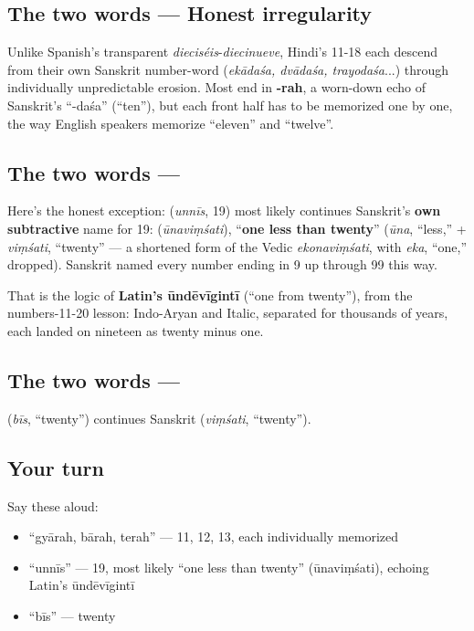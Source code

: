 \subsection*{The two words — Honest irregularity}
Unlike Spanish's transparent \emph{dieciséis}-\emph{diecinueve}, Hindi's 11-18 each descend from their own Sanskrit number-word (\emph{ekādaśa, dvādaśa, trayodaśa}...) through individually unpredictable erosion. Most end in \textbf{-rah}, a worn-down echo of Sanskrit's \textquotedblleft{}-daśa\textquotedblright{} (\textquotedblleft{}ten\textquotedblright{}), but each front half has to be memorized one by one, the way English speakers memorize \textquotedblleft{}eleven\textquotedblright{} and \textquotedblleft{}twelve\textquotedblright{}.

\subsection*{The two words — }
Here's the honest exception: \textbf{} (\emph{unnīs}, 19) most likely continues Sanskrit's \textbf{own subtractive} name for 19: \textbf{} (\emph{ūnaviṃśati}), \textquotedblleft{}\textbf{one less than twenty}\textquotedblright{} (\emph{ūna}, \textquotedblleft{}less,\textquotedblright{} + \emph{viṃśati}, \textquotedblleft{}twenty\textquotedblright{} — a shortened form of the Vedic \emph{ekonaviṃśati}, with \emph{eka}, \textquotedblleft{}one,\textquotedblright{} dropped). Sanskrit named every number ending in 9 up through 99 this way.

That is the logic of \textbf{Latin's ūndēvīgintī} (\textquotedblleft{}one from twenty\textquotedblright{}), from the numbers-11-20 lesson: Indo-Aryan and Italic, separated for thousands of years, each landed on nineteen as twenty minus one.

\subsection*{The two words — }
\textbf{} (\emph{bīs}, \textquotedblleft{}twenty\textquotedblright{}) continues Sanskrit \textbf{} (\emph{viṃśati}, \textquotedblleft{}twenty\textquotedblright{}).

\subsection*{Your turn}
Say these aloud:

\begin{itemize}
\raggedright
  \item \textquotedblleft{}gyārah, bārah, terah\textquotedblright{} — 11, 12, 13, each individually memorized
  \item \textquotedblleft{}unnīs\textquotedblright{} — 19, most likely \textquotedblleft{}one less than twenty\textquotedblright{} (ūnaviṃśati), echoing Latin's ūndēvīgintī
  \item \textquotedblleft{}bīs\textquotedblright{} — twenty
\end{itemize}

